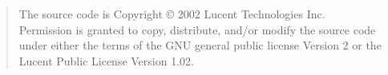 \begin{quote}
The source code is Copyright \copyright{} 2002 Lucent Technologies Inc.\\
Permission is granted to copy, distribute, and/or modify the source code
under either the terms of the GNU general public license Version 2
or the Lucent Public License Version 1.02.
\end{quote}
